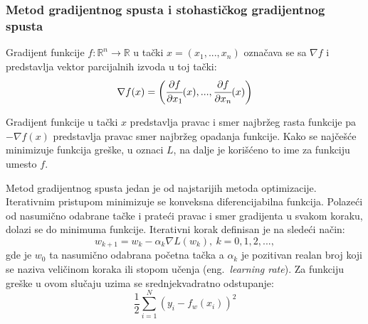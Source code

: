 \subsubsection{Metod gradijentnog spusta i stohastičkog gradijentnog spusta}
\label{sss:grad_spust}

Gradijent funkcije $f:\mathbb{R}^n \rightarrow \mathbb{R}$ u tački $x=(x_1, ..., x_n)$ označava se sa $\nabla f$ i predstavlja vektor parcijalnih izvoda u toj tački:
\begin{equation}
\nabla f(x) = \bigg( \cfrac{\partial f}{\partial x_1}(x),...,\cfrac{\partial f}{\partial x_n}(x) \bigg)
\end{equation}

Gradijent funkcije u tački $x$ predstavlja pravac i smer najbržeg rasta funkcije pa $- \nabla f(x)$ predstavlja pravac smer najbržeg opadanja funkcije. Kako se najčešće minimizuje funkcija greške, u oznaci $L$, na dalje je korišćeno to ime za funkciju umesto $f$.
\par 
Metod gradijentnog spusta jedan je od najstarijih metoda  optimizacije. Iterativnim pristupom minimizuje se konveksna diferencijabilna funkcija. Polazeći od nasumično odabrane tačke i prateći pravac i smer gradijenta u svakom koraku, dolazi se do minimuma funkcije. Iterativni korak definisan je na sledeći način:
\begin{equation}
	\label{eq:gradijentni_spust}
	w_{k+1} = w_k - \alpha_k \nabla L(w_k),~ k=0, 1, 2, ... ,
\end{equation}
gde je $w_0$ ta nasumično odabrana početna tačka a $\alpha_k$ je pozitivan realan broj koji se naziva veličinom koraka ili stopom učenja (eng.~{\em learning rate}). 
Za funkciju greške u ovom slučaju uzima se srednjekvadratno odstupanje:
\begin{equation}
	\frac{1}{2}\sum_{i=1}^{N} (y_i - f_w(x_i))^2
\end{equation}

